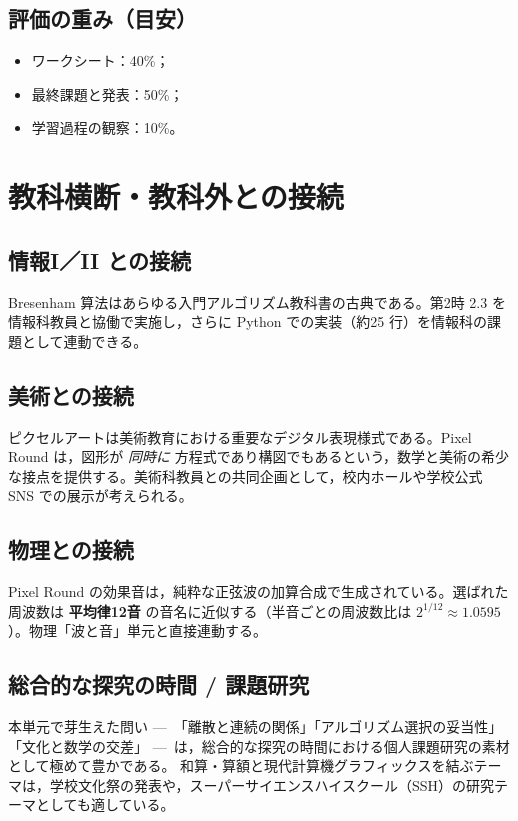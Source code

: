\documentclass[12pt,a4paper]{scrartcl}
\newcommand{\acc}[1]{\textcolor{accent}{\textbf{#1}}}
\begin{document}
\subsection{評価の重み（目安）}
\begin{itemize}[leftmargin=1.3em,itemsep=0.1em,topsep=0.2em,nosep]
  \item ワークシート：40\%；
  \item 最終課題と発表：50\%；
  \item 学習過程の観察：10\%。
\end{itemize}

\section{教科横断・教科外との接続}

\subsection{情報I／II との接続}
Bresenham 算法はあらゆる入門アルゴリズム教科書の古典である。第2時 2.3 を情報科教員と協働で実施し，さらに Python での実装（約25 行）を情報科の課題として連動できる。

\subsection{美術との接続}
ピクセルアートは美術教育における重要なデジタル表現様式である。Pixel Round は，図形が \emph{同時に} 方程式であり構図でもあるという，数学と美術の希少な接点を提供する。美術科教員との共同企画として，校内ホールや学校公式 SNS での展示が考えられる。

\subsection{物理との接続}
Pixel Round の効果音は，純粋な正弦波の加算合成で生成されている。選ばれた周波数は \acc{平均律12音} の音名に近似する（半音ごとの周波数比は $2^{1/12} \approx 1.0595$）。物理「波と音」単元と直接連動する。

\subsection{総合的な探究の時間 / 課題研究}
本単元で芽生えた問い ---\, 「離散と連続の関係」「アルゴリズム選択の妥当性」「文化と数学の交差」 ---\, は，総合的な探究の時間における個人課題研究の素材として極めて豊かである。
和算・算額と現代計算機グラフィックスを結ぶテーマは，学校文化祭の発表や，スーパーサイエンスハイスクール（SSH）の研究テーマとしても適している。
\end{document}
